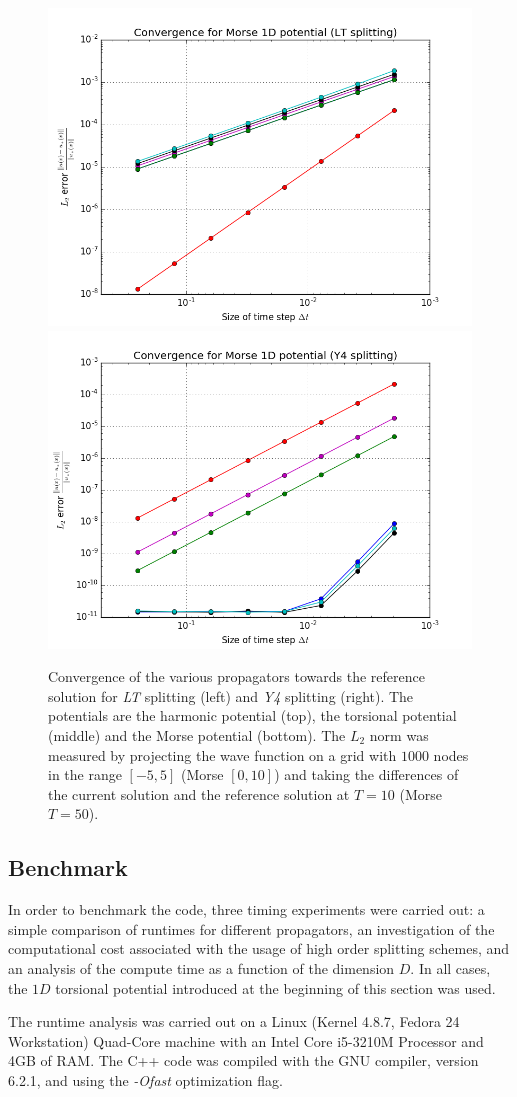 \begin{figure}[ht]
	\includegraphics[width=.45\textwidth]{figures/convergence_morse_1D_lt.png}
	\includegraphics[width=.45\textwidth]{figures/convergence_morse_1D_y4.png}
	\caption{Convergence of the various propagators towards the reference solution for \emph{LT} splitting (left) and \emph{Y4} splitting (right). The potentials are the harmonic potential (top), the torsional potential (middle) and the Morse potential (bottom). The $L_2$ norm was measured by projecting the wave function on a grid with $1000$ nodes in the range $[-5,5]$ (Morse $[0,10]$) and taking the differences of the current solution and the reference solution at $T=10$ (Morse $T=50$).}
	\label{fig:error_analysis}
\end{figure}

\subsection{Benchmark}
\label{subsec:benchmark}
%
In order to benchmark the code, three timing experiments were carried out: a simple comparison of runtimes for different propagators, an investigation of the computational cost associated with the usage of high order splitting schemes, and an analysis of the compute time as a function of the dimension $D$.
In all cases, the $1D$ torsional potential introduced at the beginning of this section was used.
\par\medskip
%
The runtime analysis was carried out on a Linux (Kernel 4.8.7, Fedora 24 Workstation) Quad-Core machine with an Intel Core i5-3210M Processor and
4GB of RAM. The C++ code was compiled with the GNU compiler, version 6.2.1, and using the \emph{-Ofast} optimization flag.



